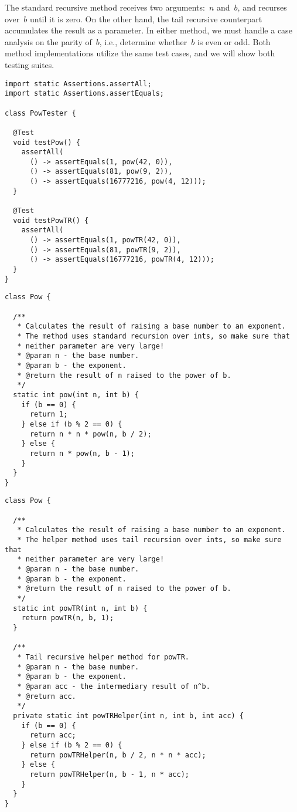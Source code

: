 The standard recursive  method receives two arguments:~$n$ and~$b$, and recurses over~$b$ until it is zero.
On the other hand, the tail recursive counterpart accumulates the result as a parameter.
In either method, we must handle a case analysis on the parity of~$b$, i.e., determine whether~$b$ is even or odd.
Both method implementations utilize the same test cases, and we will show both testing suites.

\begin{lstlisting}[language=MyJava]
import static Assertions.assertAll;
import static Assertions.assertEquals;

class PowTester {

  @Test
  void testPow() {
    assertAll(
      () -> assertEquals(1, pow(42, 0)),
      () -> assertEquals(81, pow(9, 2)),
      () -> assertEquals(16777216, pow(4, 12)));
  }

  @Test
  void testPowTR() {
    assertAll(
      () -> assertEquals(1, powTR(42, 0)),
      () -> assertEquals(81, powTR(9, 2)),
      () -> assertEquals(16777216, powTR(4, 12)));
  }
}
\end{lstlisting}

\begin{lstlisting}[language=MyJava]
class Pow {

  /**
   * Calculates the result of raising a base number to an exponent.
   * The method uses standard recursion over ints, so make sure that
   * neither parameter are very large!
   * @param n - the base number.
   * @param b - the exponent.
   * @return the result of n raised to the power of b.
   */
  static int pow(int n, int b) {
    if (b == 0) {
      return 1;
    } else if (b % 2 == 0) {
      return n * n * pow(n, b / 2);
    } else {
      return n * pow(n, b - 1);
    }
  }
}
\end{lstlisting}

\begin{lstlisting}[language=MyJava]
class Pow {

  /**
   * Calculates the result of raising a base number to an exponent.
   * The helper method uses tail recursion over ints, so make sure that
   * neither parameter are very large!
   * @param n - the base number.
   * @param b - the exponent.
   * @return the result of n raised to the power of b.
   */
  static int powTR(int n, int b) {
    return powTR(n, b, 1);
  }

  /**
   * Tail recursive helper method for powTR.
   * @param n - the base number.
   * @param b - the exponent.
   * @param acc - the intermediary result of n^b.
   * @return acc.
   */
  private static int powTRHelper(int n, int b, int acc) {
    if (b == 0) { 
      return acc; 
    } else if (b % 2 == 0) {
      return powTRHelper(n, b / 2, n * n * acc);
    } else {
      return powTRHelper(n, b - 1, n * acc);
    }
  }
}
\end{lstlisting}

